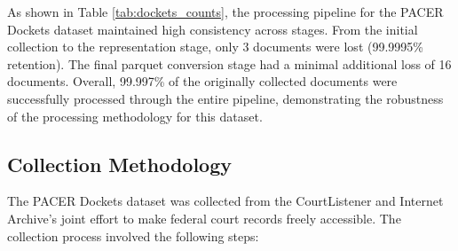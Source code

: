 As shown in Table \ref{tab:dockets_counts}, the processing pipeline for the PACER Dockets dataset maintained high consistency across stages. From the initial collection to the representation stage, only 3 documents were lost (99.9995\% retention). The final parquet conversion stage had a minimal additional loss of 16 documents. Overall, 99.997\% of the originally collected documents were successfully processed through the entire pipeline, demonstrating the robustness of the processing methodology for this dataset.

\subsection{Collection Methodology}

The PACER Dockets dataset was collected from the CourtListener and Internet Archive's joint effort to make federal court records freely accessible. The collection process involved the following steps:

